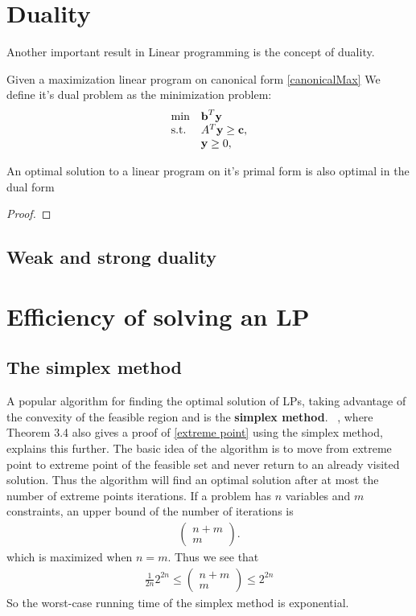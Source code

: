 \section{Duality}
Another important result in Linear programming is the concept of duality.
\begin{definition}
Given a maximization linear program on canonical form \ref{canonicalMax}
We define it's dual problem as the minimization problem:
\begin{align}\label{canonicalMaxDual}
\begin{array}{ll@{}ll}
\text{min} &\textbf{b}^T\textbf{y}&\\
\text{s.t.} &A^T\textbf{y} \geq \textbf{c},&\\
&\textbf{y} \geq 0,&\\
\end{array}
\end{align}
\end{definition}
\begin{theorem}
An optimal solution to a linear program on it's primal form is also optimal in the dual form
\begin{proof}
\end{proof}
\end{theorem}
\subsection{Weak and strong duality}
\fi
\section{Efficiency of solving an LP}
\subsection{The simplex method}
A popular algorithm for finding the optimal solution of LPs, taking advantage of the convexity of the feasible region and  is the \textbf{simplex method}. ~\cite{vanderbei2015linear}, where Theorem 3.4 also gives a proof of \ref{extreme point} using the simplex method, explains this further. The basic idea of the algorithm is to move from extreme point to extreme point of the feasible set and never return to an already visited solution. Thus the algorithm will find an optimal solution after at most the number of extreme points iterations. If a problem has $n$ variables and $m$ constraints, an upper bound of the number of iterations is 
\begin{align*}
\begin{pmatrix}
n+m\\m
\end{pmatrix}.
\end{align*} 
which is maximized when $n=m$. Thus we see that 
\begin{align*}
\frac{1}{2n}2^{2n}\leq\begin{pmatrix}
n+m\\m
\end{pmatrix}\leq 2^{2n}
\end{align*}
So the worst-case running time of the simplex method is exponential.

